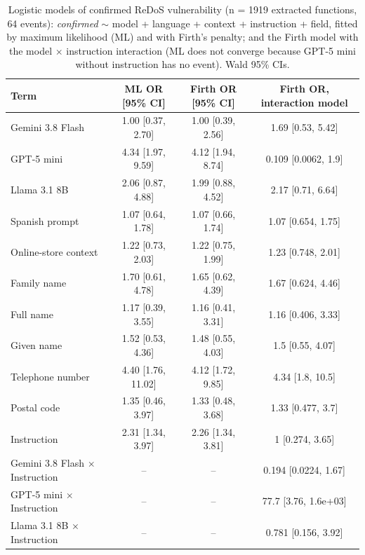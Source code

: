 \begin{table}[H]
\caption{Logistic models of confirmed ReDoS vulnerability (n = 1919 extracted functions, 64 events): \emph{confirmed} $\sim$ model + language + context + instruction + field, fitted by maximum likelihood (ML) and with Firth's penalty; and the Firth model with the model $\times$ instruction interaction (ML does not converge because GPT-5 mini without instruction has no event). Wald 95\% CIs.\label{tab:redoslogit}}
\begin{tabularx}{\textwidth}{Xccc}
\toprule
\textbf{Term} & \textbf{ML OR [95\% CI]} & \textbf{Firth OR [95\% CI]} & \textbf{Firth OR, interaction model}\\
\midrule
Gemini 3.8 Flash & 1.00 [0.37, 2.70] & 1.00 [0.39, 2.56] & 1.69 [0.53, 5.42]\\
GPT-5 mini & 4.34 [1.97, 9.59] & 4.12 [1.94, 8.74] & 0.109 [0.0062, 1.9]\\
Llama 3.1 8B & 2.06 [0.87, 4.88] & 1.99 [0.88, 4.52] & 2.17 [0.71, 6.64]\\
Spanish prompt & 1.07 [0.64, 1.78] & 1.07 [0.66, 1.74] & 1.07 [0.654, 1.75]\\
Online-store context & 1.22 [0.73, 2.03] & 1.22 [0.75, 1.99] & 1.23 [0.748, 2.01]\\
Family name & 1.70 [0.61, 4.78] & 1.65 [0.62, 4.39] & 1.67 [0.624, 4.46]\\
Full name & 1.17 [0.39, 3.55] & 1.16 [0.41, 3.31] & 1.16 [0.406, 3.33]\\
Given name & 1.52 [0.53, 4.36] & 1.48 [0.55, 4.03] & 1.5 [0.55, 4.07]\\
Telephone number & 4.40 [1.76, 11.02] & 4.12 [1.72, 9.85] & 4.34 [1.8, 10.5]\\
Postal code & 1.35 [0.46, 3.97] & 1.33 [0.48, 3.68] & 1.33 [0.477, 3.7]\\
Instruction & 2.31 [1.34, 3.97] & 2.26 [1.34, 3.81] & 1 [0.274, 3.65]\\
Gemini 3.8 Flash $\times$ Instruction & -- & -- & 0.194 [0.0224, 1.67]\\
GPT-5 mini $\times$ Instruction & -- & -- & 77.7 [3.76, 1.6e+03]\\
Llama 3.1 8B $\times$ Instruction & -- & -- & 0.781 [0.156, 3.92]\\
\bottomrule
\end{tabularx}
\end{table}

